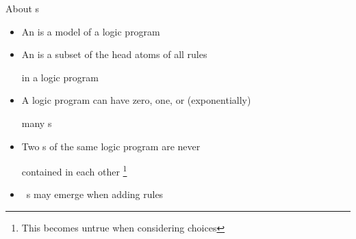\begin{frame}{About s}
  \bigskip
  \begin{itemize}
  \item An  is a model of a logic program
    \smallskip
  \item An  is a subset of the head atoms of all rules\par in a logic program
    \smallskip
  \item A logic program can have zero, one, or (exponentially)\par many \alt<3>{answer set}{stable model}s
    \smallskip
  \item Two s of the same logic program are never\par contained in each other
    \footnote{This becomes untrue when considering choices}
    \bigskip
  \item<2->  \ s may emerge when adding rules
  \end{itemize}
\end{frame}
%
